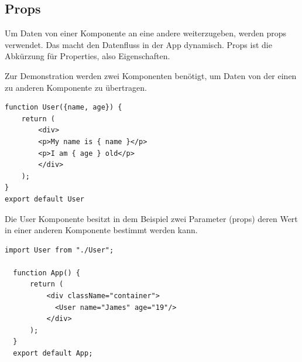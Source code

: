 \subsection*{Props}
Um Daten von einer Komponente an eine andere weiterzugeben, werden props verwendet. Das macht den Datenfluss in der App 
dynamisch. Props ist die Abkürzung für Properties, also Eigenschaften.

Zur Demonstration werden zwei Komponenten benötigt, um Daten von der einen zu anderen Komponente zu übertragen.
\begin{lstlisting}[caption=Props in React]
  function User({name, age}) {
    return (
        <div>
        <p>My name is { name }</p>
        <p>I am { age } old</p>
        </div>
    );
}
export default User
\end{lstlisting}

Die User Komponente besitzt in dem Beispiel zwei Parameter (props) deren Wert in einer anderen Komponente bestimmt werden kann.

\begin{lstlisting}[caption=Props Beispiel 2 in React]
  import User from "./User";
  
  function App() {
      return (
          <div className="container">
            <User name="James" age="19"/>
          </div>
      );
  }
  export default App;
\end{lstlisting}\cite{APCW2009}




\clearpage


